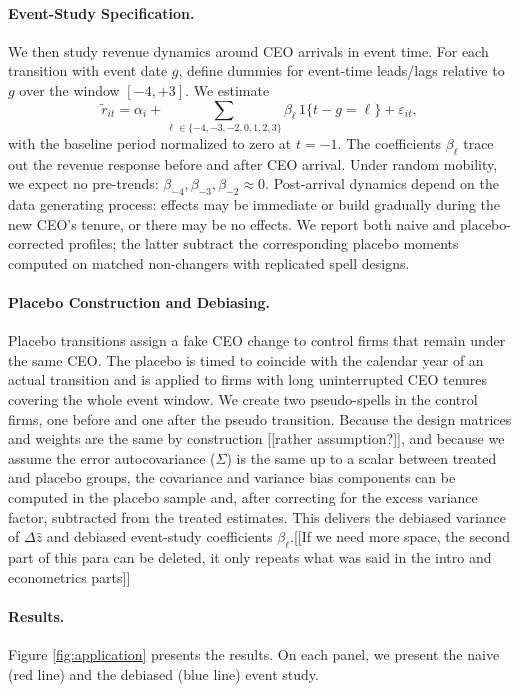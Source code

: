 \documentclass[11pt,a4paper]{article}
\begin{document}
\paragraph{Event-Study Specification.} We then study revenue dynamics around CEO arrivals in event time. For each transition with event date \(g\), define dummies for event-time leads/lags relative to \(g\) over the window \([-4,+3]\). We estimate
\begin{equation}
\tilde r_{it} = \alpha_i + \sum_{\ell\in\{-4,-3,-2,0,1,2,3\}} \beta_{\ell}\, 1\{t-g=\ell\} + \varepsilon_{it},
\end{equation}
with the baseline period normalized to zero at \(t=-1\). The coefficients \(\beta_{\ell}\) trace out the revenue response before and after CEO arrival. Under random mobility, we expect no pre-trends: \(\beta_{-4},\beta_{-3},\beta_{-2}\approx 0\). Post-arrival dynamics depend on the data generating process: effects may be immediate or build gradually during the new CEO’s tenure, or there may be no effects. We report both naive and placebo-corrected profiles; the latter subtract the corresponding placebo moments computed on matched non-changers with replicated spell designs.

\paragraph{Placebo Construction and Debiasing.} Placebo transitions assign a fake CEO change to control firms that remain under the same CEO. The placebo is timed to coincide with the calendar year of an actual transition and is applied to firms with long uninterrupted CEO tenures covering the whole event window. We create two pseudo-spells in the control firms, one before and one after the pseudo transition. Because the design matrices and weights are the same by construction [[rather assumption?]], and because we assume the error autocovariance (\(\Sigma\)) is the same up to a scalar between treated and placebo groups, the covariance and variance bias components can be computed in the placebo sample and, after correcting for the excess variance factor, subtracted from the treated estimates. This delivers the debiased variance of \(\Delta \hat z\) and debiased event-study coefficients \(\beta_{\ell}\).[[If we need more space, the second part of this para can be deleted, it only repeats what was said in the intro and econometrics parts]]

\paragraph{Results.} Figure \ref{fig:application} presents the results. On each panel, we present the naive (red line) and the debiased (blue line) event study. 
\end{document}
